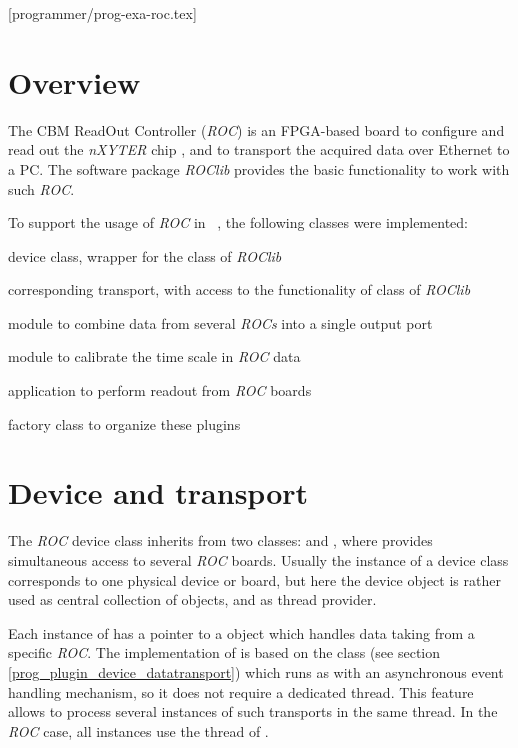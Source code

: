 [programmer/prog-exa-roc.tex]

\section{Overview}

The CBM ReadOut Controller ({\em ROC}) is an FPGA-based board
to configure and read out the
{\em nXYTER} chip \cite{nxyter}, and to transport the acquired data over Ethernet to a PC. 
The software package {\em ROClib} 
provides the basic functionality to work with such {\em ROC}.
 
To support the usage of {\em ROC} in \dabc~, the following classes 
were implemented:
\bbul
\item {}  device class, wrapper for the 
class of {\em ROClib} 
\item {}  corresponding transport, with access to the functionality of  class of {\em ROClib} 
\item {}  module to combine data from several {\em ROCs} into a single output port 
\item {}  module to calibrate the time scale in {\em ROC} data  
\item {}  application to perform readout from {\em ROC} boards   
\item {}  factory class to organize these plugins 
\ebul


\section{Device and transport}

The {\em ROC} device class  inherits from two classes:  and ,
where  provides simultaneous access to several {\em ROC} boards. 
Usually the instance of a device class corresponds to one physical device or board, 
but here the device object is rather used as central collection of  objects, and as thread provider.

Each instance of  has a pointer to a  object
which handles data taking from a specific {\em ROC}. 
The implementation of  is based on the  class (see section \ref{prog_plugin_device_datatransport}) which
runs as  with an asynchronous event handling mechanism,
so it does not require a dedicated thread.
This feature allows to process several instances of such transports in the same thread.
In the {\em ROC} case, all  instances use the thread of .   
  
